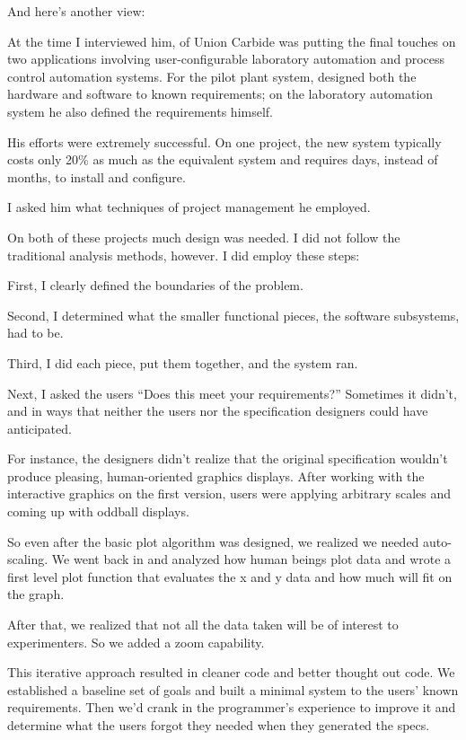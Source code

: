 \noindent And here's another view:%
\begin{interview}
\noindent At the time I interviewed him,  of Union
Carbide was putting the final touches on two applications involving
user-configurable laboratory automation and process control automation
systems. For the pilot plant system,  designed both the
hardware and software to known requirements; on the laboratory
automation system he also defined the requirements himself.

His efforts were extremely successful. On one project, the new system
typically costs only 20\% as much as the equivalent system and
requires days, instead of months, to install and configure.

I asked him what techniques of project management he employed.

\begin{tfquot}
On both of these projects much design was needed. I did not follow the
traditional analysis methods, however. I did employ these steps:

First, I clearly defined the boundaries of the problem.

Second, I determined what the smaller functional pieces, the software
subsystems, had to be.

Third, I did each piece, put them together, and the system ran.

Next, I asked the users ``Does this meet your requirements?''
Sometimes it didn't, and in ways that neither the users nor the
specification designers could have anticipated.

For instance, the designers didn't realize that the original
specification wouldn't produce pleasing, human-oriented graphics
displays. After working with the interactive graphics on the first
version, users were applying arbitrary scales and coming up with
oddball displays.

So even after the basic plot algorithm was designed, we realized we
needed auto-scaling. We went back in and analyzed how human beings
plot data and wrote a first level plot function that evaluates the x
and y data and how much will fit on the graph.

After that, we realized that not all the data taken will be of
interest to experimenters. So we added a zoom capability.

This iterative approach resulted in cleaner code and better thought
out code. We established a baseline set of goals and built a minimal
system to the users' known requirements. Then we'd crank in the
programmer's experience to improve it and determine what the users
forgot they needed when they generated the specs.


\end{tfquot}
\end{interview}
